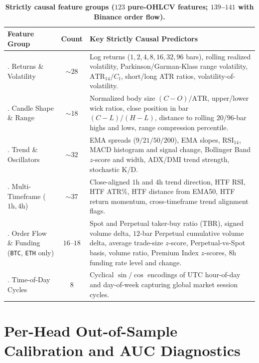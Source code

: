 \documentclass{article}
\newcommand{\ATR}{\mathrm{ATR}}
\begin{document}
\begin{table}[h]
  \centering
  \caption{\textbf{Strictly causal feature groups ($123$ pure-OHLCV features; $139$--$141$ with Binance order flow).}}
  \label{tab:app_features}
  \small
  \begin{tabular}{@{}>{\raggedright\arraybackslash}p{3.1cm}cp{8.5cm}@{}}
    \toprule
    Feature Group & Count & Key Strictly Causal Predictors \\
    \midrule
    1. Returns \& Volatility & $\sim 28$ & Log returns ($1,2,4,8,16,32,96$ bars), rolling realized volatility, Parkinson/Garman-Klass range volatility, $\ATR_{14}/C_t$, short/long ATR ratios, volatility-of-volatility. \\
    \addlinespace[3pt]
    2. Candle Shape \& Range & $\sim 18$ & Normalized body size $(C-O)/\ATR$, upper/lower wick ratios, close position in bar $(C-L)/(H-L)$, distance to rolling $20$/$96$-bar highs and lows, range compression percentile. \\
    \addlinespace[3pt]
    3. Trend \& Oscillators & $\sim 32$ & EMA spreads ($9/21/50/200$), EMA slopes, $\mathrm{RSI}_{14}$, MACD histogram and signal change, Bollinger Band $z$-score and width, ADX/DMI trend strength, stochastic K/D. \\
    \addlinespace[3pt]
    4. Multi-Timeframe ($1\text{h}, 4\text{h}$) & $\sim 37$ & Close-aligned $1\text{h}$ and $4\text{h}$ trend direction, HTF RSI, HTF ATR\%, HTF distance from EMA50, HTF return momentum, cross-timeframe trend alignment flags. \\
    \addlinespace[3pt]
    5. Order Flow \& Funding (\texttt{BTC}, \texttt{ETH} only) & $16$--$18$ & Spot and Perpetual taker-buy ratio (TBR), signed volume delta, $12$-bar Perpetual cumulative volume delta, average trade-size $z$-score, Perpetual-vs-Spot basis, volume ratio, Premium Index $z$-scores, $8\text{h}$ funding rate level and change. \\
    \addlinespace[3pt]
    6. Time-of-Day Cycles & $8$ & Cyclical $\sin/\cos$ encodings of UTC hour-of-day and day-of-week capturing global market session cycles. \\
    \bottomrule
  \end{tabular}
\end{table}

\section{Per-Head Out-of-Sample Calibration and AUC Diagnostics}
\label{app:heads}
\end{document}
